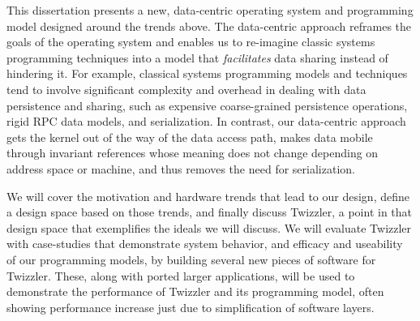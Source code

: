 
This dissertation presents a new, data-centric operating system and programming model designed around the trends above.
The data-centric approach reframes the goals of the operating system and enables us to re-imagine classic systems
programming techniques into a model that \emph{facilitates} data sharing instead of hindering it. For example, classical
systems programming models and techniques tend to involve significant complexity and overhead in dealing with data persistence and
sharing, such as expensive coarse-grained persistence operations, rigid RPC data models, and serialization. In contrast,
our data-centric approach gets the kernel out of the way of the data access path, makes data mobile through invariant
references whose meaning does not change depending on address space or machine, and thus removes the need for serialization.

We will cover the motivation and hardware trends
that lead to our design, define a design space based on those trends, and finally discuss Twizzler, a point in that
design space that exemplifies the ideals we will discuss. We will evaluate Twizzler with case-studies that demonstrate
system behavior, and efficacy and useability of our programming models, by building several new pieces of software
for Twizzler. These, along with ported larger applications, will be used to demonstrate the performance of Twizzler and its
programming model, often showing performance increase just due to simplification of software layers.

\vfill


\endgroup

\vfill

